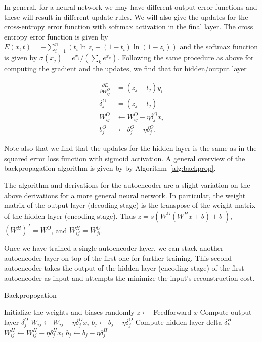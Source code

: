 In general, for a neural network we may have different output error functions and these will result in different update rules. We will also give the updates
for the cross-entropy error function with softmax activation in the final layer.
The cross entropy error function is given by $E(x,t) = -\sum_{i=1}^n \left(t_i\ln z_i + (1-t_i)\ln(1-z_i)\right)$
and the softmax function is given by $\sigma(x_j) = e^{x_j} /(\sum_k e^{x_k})$. Following the same procedure as above
for computing the gradient and the updates, we find that for hidden/output layer

\begin{equation}
\begin{split}
\frac{\partial E}{\partial W^O_{ij}} &= (z_j - t_j)y_i \\
\delta^O_j &= (z_j-t_j) \\
W^O_{ij} &\leftarrow W^O_{ij} - \eta \delta^O_j x_i \\
b^O_j &\leftarrow b^O_j - \eta\delta^O_j.
\end{split}
\end{equation}

Note also that we find that the updates for the hidden layer is the same as in the squared error loss function with sigmoid activation. A general overview of the backpropagation algorithm is given by by Algorithm~\ref{alg:backprop}.

The algorithm and derivations for the autoencoder are a slight variation on the above derivations for a more general neural network. In particular, the weight matrix of the output layer (decoding stage) is the transpose of the weight matrix of the hidden layer (encoding stage). Thus $z=s(W^{O}(W^{H}x + b) + b^{'})$, $(W^H)^T = W^O$, and $W^H_{ij} = W^O_{ji}$. 

Once we have trained a single autoencoder layer, we can stack another autoencoder layer on top of the first one for further training. This second autoencoder takes the output of the hidden layer (encoding stage) of the first autoencoder as input and attempts the minimize the input's reconstruction cost.

\begin{algorithm}[h]
\caption{Backpropogation}
\label{alg:backprop}
\begin{algorithmic}
\STATE Initialize the weights and biases randomly
		\STATE $z\gets$ Feedforward $x$
		\STATE Compute output layer $\delta_j^O$
		\STATE ${W_{ij} \leftarrow W_{ij} - \eta \delta^O_j x_i}$
		\STATE $b_j \leftarrow b_j - \eta\delta^O_j$
			\STATE Compute hidden layer delta $\delta_k^H$
			\STATE ${W^H_{ij} \leftarrow W^H_{ij} - \eta\delta^H_jx_i}$
			\STATE $b_j \leftarrow b_j - \eta\delta^H_j$
		\ENDFOR
	\ENDFOR
\ENDFOR
\end{algorithmic}
\end{algorithm}

